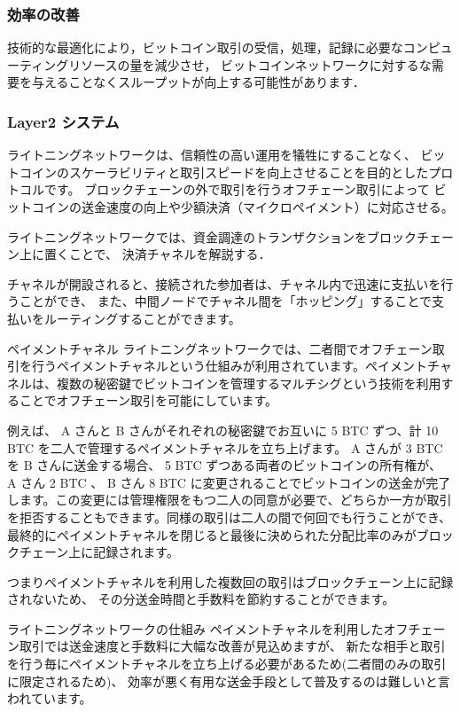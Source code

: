 \documentclass[a4paper,12pt]{jsarticle}
\begin{document}
\subsubsection{効率の改善}%
技術的な最適化により，ビットコイン取引の受信，処理，記録に必要なコンピューティングリソースの量を減少させ，
ビットコインネットワークに対するな需要を与えることなくスループットが向上する可能性があります．

\subsubsection{Layer2 システム}%

ライトニングネットワークは、信頼性の高い運用を犠牲にすることなく、
ビットコインのスケーラビリティと取引スピードを向上させることを目的としたプロトコルです。
ブロックチェーンの外で取引を行うオフチェーン取引によって
ビットコインの送金速度の向上や少額決済（マイクロペイメント）に対応させる。

ライトニングネットワークでは、資金調達のトランザクションをブロックチェーン上に置くことで、
決済チャネルを解説する．

チャネルが開設されると、接続された参加者は、チャネル内で迅速に支払いを行うことができ、
また、中間ノードでチャネル間を「ホッピング」することで支払いをルーティングすることができます。

ペイメントチャネル
ライトニングネットワークでは、二者間でオフチェーン取引を行うペイメントチャネルという仕組みが利用されています。ペイメントチャネルは、複数の秘密鍵でビットコインを管理するマルチシグという技術を利用することでオフチェーン取引を可能にしています。

例えば、 A さんと B さんがそれぞれの秘密鍵でお互いに 5 BTC ずつ、計 10 BTC を二人で管理するペイメントチャネルを立ち上げます。 A さんが 3 BTC を B さんに送金する場合、 5 BTC ずつある両者のビットコインの所有権が、 A さん 2 BTC 、 B さん 8 BTC に変更されることでビットコインの送金が完了します。この変更には管理権限をもつ二人の同意が必要で、どちらか一方が取引を拒否することもできます。同様の取引は二人の間で何回でも行うことができ、最終的にペイメントチャネルを閉じると最後に決められた分配比率のみがブロックチェーン上に記録されます。

つまりペイメントチャネルを利用した複数回の取引はブロックチェーン上に記録されないため、
その分送金時間と手数料を節約することができます。

ライトニングネットワークの仕組み
ペイメントチャネルを利用したオフチェーン取引では送金速度と手数料に大幅な改善が見込めますが、
新たな相手と取引を行う毎にペイメントチャネルを立ち上げる必要があるため(二者間のみの取引に限定されるため)、
効率が悪く有用な送金手段として普及するのは難しいと言われています。
\end{document}
